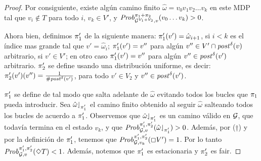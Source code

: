 \begin{proof}
  Por consiguiente, existe algún camino finito $\hat{\omega} = v_0 v_1 v_2 \dots v_k$
  en este MDP tal que $v_i \notin T$ para todo $i$, $v_k \in V'$, y
  $\mathit{Prob}^{\pi_{1}{+}\pi_{2}}_{\mathcal{G}^{V_1+V_2},v}(v_0\dots v_k) > 0$.

  Ahora bien, definimos $\pi_{1}'$ de la siguiente manera:
  $\pi_{1}'(v') = \hat{\omega}_{i+1}$, si $i < k$ es el índice mas grande tal que $v' = \hat{\omega}_{i}$;
  $\pi_{1}'(v') = v''$ para algún $v'' \in
  V'\cap\mathit{post}^\delta(v)$ arbitrario, si $v' \in V'$;
  en otro caso $\pi_{1}'(v') = v''$ para algún
  $v'' \in \mathit{post}^\delta(v')$ arbitrario.
  $\pi_{2}'$ se define usando una distribución uniforme, es decir:
  $\pi_{2}'(v')(v'') = \frac{1}{\# \mathit{post}^\delta(v')}$, para todo $v'
  \in V_2$ y $v'' \in \mathit{post}^\delta(v')$.
  
  $\pi_{1}'$ se define de tal modo que salta adelante de $\hat{\omega}$
  evitando todos los bucles que $\pi_{1}$ pueda introducir.  Sea
  $\hat{\omega}{\downharpoonleft}_{\pi_{1}'}$ el camino finito obtenido al seguir $\hat{\omega}$ salteando todos los bucles de acuerdo a $\pi_{1}'$.
  Observemos que $\hat{\omega}{\downharpoonleft}_{\pi_{1}'}$ es un camino válido en $\mathcal{G}$, que todavía termina en el estado $v_k$, y que
  $\mathit{Prob}^{\pi_{1}',\pi_{2}'}_{\mathcal{G},v}({\hat{\omega}{\downharpoonleft}_{\pi_{1}'}})>0$.
  Además, por ($\dag$) y por la definición de $\pi_{1}'$, tenemos que $\mathit{Prob}^{\pi_{1}',\pi_{2}'}_{\mathcal{G}, v_k}(\Box V') = 1$.
  Por lo tanto $\mathit{Prob}^{\pi_{1}',\pi_{2}'}_{\mathcal{G}, v}(\Diamond T) < 1$.
  Además, notemos que $\pi_{1}'$ es estacionaria y $\pi_{2}'$
  es fair.
\qedhere
\end{proof}


